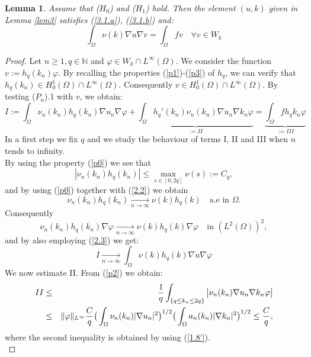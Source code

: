 \documentclass{elsart}
\newtheorem{lemm}[defi]{Lemma}
\begin{document}
\begin{lemm}\label{lem5}
Assume that ($H_0$) and ($H_1$) hold. Then the element $(u,k)$
given in Lemma \ref{lem3} satisfies (\ref{3.1.a}), (\ref{3.1.b}) and:
\begin{equation}
\int_{\Omega} \nu(k) \nabla u \nabla v = \int_{\Omega} f v \quad 
\forall v \in W_k \label{3.2}
\end{equation}
\end{lemm}
\begin{proof}
Let $n\geq1, q \in \mathbb N$ and $\varphi \in W_k\cap
L^{\infty}(\Omega)$. We consider the function $v:=h_q(k_n)\varphi$. By
recalling the properties (\ref{p1})-(\ref{p3}) of $h_q$, we can verify
that $h_q(k_n) \in H^1_0(\Omega)\cap L^{\infty}(\Omega)$. Consequently 
$v\in  H^1_0(\Omega)\cap L^{\infty}(\Omega)$. By testing ($P_n$).1
with $v$, we obtain:
\begin{equation}
I:=\int_{\Omega}\nu_n(k_n)h_q(k_n)\nabla u_n \nabla \varphi + 
\underbrace{\int_{\Omega} h_q'(k_n)\nu_n(k_n)\nabla u_n \nabla k_n
  \varphi
}_{:=II} = \underbrace{\int_{\Omega}f h_q{k_n}\varphi}_{:=III}
\label{lem5.1}
\end{equation}
In a first step we fix $q$ and we study the behaviour of terms I,
II and III when $n$ tends to infinity. \\ 
By using the property (\ref{p0}) we see that 
$$|\nu_n(k_n)h_q(k_n)| \leq \max\limits_{s\in[0,2q]} \nu(s) := C_q,$$ 
and by using (\ref{p0}) together with (\ref{2.2}) we obtain 
$$\nu_n(k_n)h_q(k_n) \underset{n\to\infty}{\rightarrow}
\nu(k)h_q(k) \quad \text{a.e in }\Omega.$$
Consequently 
$$\nu_n(k_n)h_q(k_n)\nabla \varphi \underset{n\to\infty}{\rightarrow}
\nu(k)h_q(k)\nabla \varphi \quad \text{in }(L^2(\Omega))^2,$$
and by also employing (\ref{2.3}) we get: 
\begin{equation}
I \underset{n\to\infty}{\rightarrow} \int_{\Omega}\nu(k)h_q(k)\nabla u
\nabla \varphi \label{lem5.2}
\end{equation}
We now estimate II. From (\ref{p2}) we obtain: 
\begin{eqnarray}
II &\leq& \frac{1}{q} \int_{\{q\leq k_n\leq 2q\}} 
\big|\nu_n(k_n) \nabla u_n \nabla k_n \varphi \big| \notag \\ 
&\leq& \|\varphi\|_{L^{\infty}}\frac{C}{q} 
\big( \int_{\Omega} \nu_n(k_n)|\nabla u_n |^2 \big)^{1/2}
\big( \int_{\Omega} a_n(k_n)|\nabla k_n |^2 \big)^{1/2} 
\leq \frac{C}{q}, \label{lem5.3}
\end{eqnarray}
where the second inequality is obtained by using (\ref{1.8'}). \\ 

\end{proof}
\end{document}
